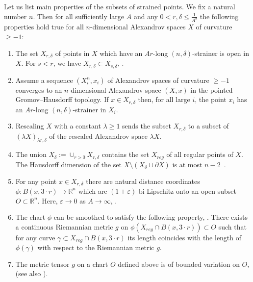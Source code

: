 \documentclass[12pt,leqno,intlimits]{amsart}
\numberwithin{equation}{section}
\theoremstyle{definition}
\theoremstyle{remark}
\newcommand{\R}{\mathbb{R}}
\def\:{\colon}
\begin{document}
Let us list main properties of the subsets of strained points.
We fix a natural number $n$.
 {\color{red} Then for all sufficiently large $A$ and any $0<r,\delta \leq \frac 1 {A^2}$  
  the following properties hold true for all $n$-dimensional Alexandrov spaces $X$ of curvature $\geq -1$:}
\begin{enumerate}

\item The set $X_{r,\delta}$ of points in $X$ which have an $Ar$-long $(n,\delta)$-strainer is open in $X$. For $s<r$, we have $X_{r,\delta} \subset X_{s,\delta}$, \cite[9.7]{BGP}.

\item Assume a sequence $(X_i ^n,x_i)$ of Alexandrov spaces of curvature $\geq -1$ converges to an $n$-dimensional Alexandrov space $(X,x)$ in the pointed Gromov--Hausdorff topology.
If $x\in X_{r,\delta}$ then, for all large $i$, the point $x_i$ has an $Ar$-long $(n, \delta)$-strainer in $X_i$.

\item Rescaling $X$ with a constant $\lambda \geq 1$ sends the subset $X_{r,\delta}$ to a subset of $(\lambda X )_{\lambda r, \delta} $ of the rescaled Alexandrov space $\lambda X$.

\item The union $X_{\delta}:= \cup _{r>0} X_{r,\delta}$ contains the set $X_{reg}$ of all regular points of $X$. The Hausdorff dimension of the set $X\setminus (X_{\delta} \cup \partial X)$ is at most $n-2$~\cite[10.6, 10.6.1, 12.8]{BGP}.

\item For any point $x\in X_{r,\delta}$ there are natural distance coordinates $\phi\: B (x,{3{\cdot}r}) \to \R^n$ which are $(1+\varepsilon)$-bi-Lipschitz onto an open subset $O \subset \R^n$. Here, $\varepsilon\to 0$ as $A\to\infty$, \cite[9.4]{BGP}.

\item The chart $\phi$ can be smoothed to satisfy the following property, \cite[Theorem B]{Otsu-Shioya}.
There exists a continuous Riemannian metric $g$ on $\phi (X_{reg} \cap B (x,{3{\cdot}r})) \subset O$ such that for any curve $\gamma \subset X_{reg} \cap B(x,{3{\cdot}r})$ its length
coincides with the length of $\phi (\gamma )$ with respect to the Riemannian metric $g$.

\item The metric tensor $g$ on a chart $O$ defined above is of bounded variation on $O$, \cite[4.2]{Per-DC} (see also \cite{AB15}).
\end{enumerate}
\end{document}
